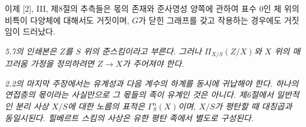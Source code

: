 이제 [2], III, 제8절의 추측들은 몫의 존재와 준사영성 양쪽에 관하여 표수
0인 체 위의 비특이 다양체에 대해서도 거짓이며, $G$가 닫힌 그래프를 갖고
작용하는 경우에도 거짓임이 드러났다.

\par\smallskip
\begingroup\footnotesize




\noindent\textit{5.7의 인쇄본은 $Z$를 $S$ 위의 준스킴이라고 부른다. 그러나 $\Pi_{X/S}(Z/X)$와 $X$ 위의 매끄러움 가정을 정의하려면 $Z\to X$가 주어져야 한다.}\par
\noindent\textit{2.2의 마지막 주장에서는 유계성과 다음 계수의 하계를 동시에 귀납해야 한다. 하나의 연접층의 몫이라는 사실만으로 그 몫들의 족이 유계인 것은 아니다. 제6절에서 일반적인 분리 사상 $X/S$에 대한 노름의 표적은 $\Gamma^n_S(X)$이며, $X/S$가 평탄할 때 대칭곱과 동일시된다. 힐베르트 스킴의 사상은 유한 평탄 족에서 별도로 구성된다.}\par
\endgroup
